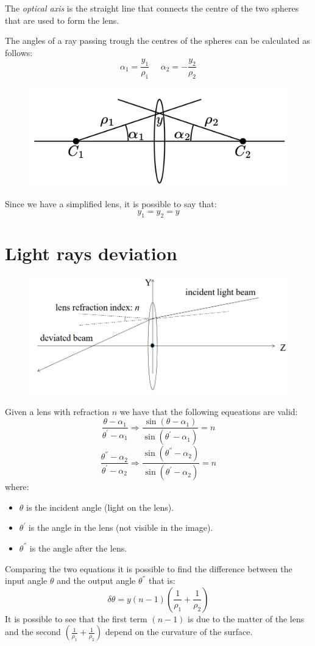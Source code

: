 \documentclass[12pt, a4paper]{report}
\newtheorem[style=M,bodystyle=\normalfont]{theorem}{Theorem}
\newtheorem[style=M,bodystyle=\normalfont]{corollary}{Corollary}
\newtheorem[style=M,bodystyle=\normalfont]{lemma}{Lemma}
\newtheorem[style=M,bodystyle=\normalfont]{definition}{Definition}
\begin{document}
    \begin{definition}
        The \emph{optical axis} is the straight line that connects the centre of the two spheres that are used to form the lens. 
    \end{definition}
    The angles of a ray passing trough the centres of the spheres can be calculated as follows: 
    \[\alpha_1=\dfrac{y_1}{\rho_1} \:\:\:\:\:\: \alpha_2=-\dfrac{y_2}{\rho_2}\]
    \begin{figure}[H]
        \centering
        \includegraphics[width=0.5\linewidth]{images/y.png}
    \end{figure}
    Since we have a simplified lens, it is possible to say that:
    \[y_1=y_2=y\]
    
    \section{Light rays deviation}
    \begin{figure}[H]
        \centering
       \includegraphics[width=0.5\linewidth]{images/ray.png}
   \end{figure}
    Given a lens with refraction $n$ we have that the following equeations are valid:
    \[\dfrac{\theta-\alpha_1}{\theta^{'}-\alpha_1} \Rightarrow \dfrac{\sin{(\theta-\alpha_1)}}{\sin{(\theta^{'}-\alpha_1)}}=n\]
    \[\dfrac{\theta^{''}-\alpha_2}{\theta^{'}-\alpha_2} \Rightarrow \dfrac{\sin{(\theta^{''}-\alpha_2)}}{\sin{(\theta^{'}-\alpha_2)}}=n\]
    where:
    \begin{itemize}
        \item $\theta$ is the incident angle (light on the lens). 
        \item $\theta^{'}$ is the angle in the lens (not visible in the image). 
        \item $\theta^{''}$ is the angle after the lens.
    \end{itemize}
    Comparing the two equations it is possible to find the difference between the input angle $\theta$ and the output angle $\theta^{''}$ that is: 
    \[\delta \theta=y(n-1)\left( \dfrac{1}{\rho_1} + \dfrac{1}{\rho_2}\right)\]
    It is possible to see that the first term $(n-1)$ is due to the matter of the lens and the second $\left( \frac{1}{\rho_1} + \frac{1}{\rho_2}\right)$ depend on the curvature 
    of the surface. 
\end{document}
